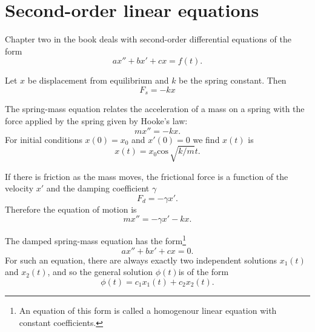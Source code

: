 \documentclass[nobib,notoc]{tufte-handout}
\begin{document}
\section{Second-order linear equations}
\begin{rema}
	Chapter two in the book deals with second-order differential equations of the form
	\begin{equation}
		\label{rema:eqn}
		ax''+bx'+cx=f(t).
	\end{equation}
\end{rema}
\begin{defi}
	Let \(x\) be displacement from equilibrium and \(k\) be the spring constant. Then
	\begin{equation*}
		F_s=-kx
	\end{equation*}
\end{defi}
\begin{defi}
	The spring-mass equation relates the acceleration of a mass on a spring with the force applied by the spring given by Hooke's law:
	\begin{equation*}
		mx''=-kx.
	\end{equation*}
	For initial conditions \(x(0)=x_0\) and \(x'(0)=0\) we find \(x(t)\) is
	\begin{equation*}
		x(t)=x_0\text{cos}\,\sqrt{k/m}t.
	\end{equation*}
\end{defi}
\begin{defi}
	If there is friction as the mass moves, the frictional force is a function of the velocity \(x'\) and the damping coefficient \(\gamma\)
	\begin{equation*}
		F_d=-\gamma x'.
	\end{equation*}
	Therefore the equation of motion is
	\begin{equation*}
		mx''=-\gamma x'-kx.
	\end{equation*}
\end{defi}
\begin{rema}
	The damped spring-mass equation has the form\footnote{An equation of this form is called a homogenour linear equation with constant coefficients.}
	\begin{equation*}
		ax''+bx'+cx=0.
	\end{equation*}
	For such an equation, there are always exactly two independent solutions \(x_1(t)\) and \(x_2(t)\), and so the general solution \(\phi(t)\)is of the form
	\begin{equation*}
		\phi(t)=c_1x_1(t)+c_2x_2(t).
	\end{equation*}
\end{rema}
\end{document}
